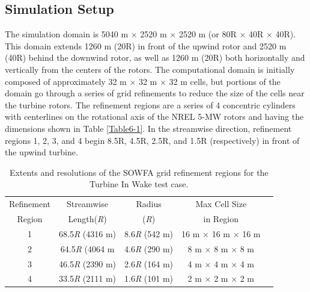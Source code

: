 \subsection{Simulation Setup} \label{section6-7-1}

The simulation domain is 5040 m $\times$ 2520 m $\times$ 2520 m (or 80R $\times$ 40R $\times$ 40R). This domain extends 1260 m (20R) in front of the upwind rotor and 2520 m (40R) behind the downwind rotor, as well as 1260 m (20R) both horizontally and vertically from the centers of the rotors. The computational domain is initially composed of approximately 32 m $\times$ 32 m $\times$ 32 m cells, but portions of the domain go through a series of grid refinements to reduce the size of the cells near the turbine rotors. The refinement regions are a series of 4 concentric cylinders with centerlines on the rotational axis of the NREL 5-MW rotors and having the dimensions shown in Table \ref{Table6-1}. In the streamwise direction, refinement regions 1, 2, 3, and 4 begin 8.5R, 4.5R, 2.5R, and 1.5R (respectively) in front of the upwind turbine.

\begin{table}[ht]
\centering
\begin{tabular}{c c c c c}
\hline
Refinement & Streamwise       & Radius     & Max Cell Size\\
Region     & Length(\emph{R}) & (\emph{R}) &  in Region\\
\hline
1          & 68.5\emph{R} (4316 m)  & 8.6\emph{R} (542 m) & 16 m $\times$ 16 m $\times$ 16 m\\
2          & 64.5\emph{R} (4064 m   & 4.6\emph{R} (290 m) & 8 m $\times$ 8 m $\times$ 8 m\\
3          & 46.5\emph{R} (2390 m)  & 2.6\emph{R} (164 m) & 4 m $\times$ 4 m $\times$ 4 m\\
4          & 33.5\emph{R} (2111 m)  & 1.6\emph{R} (101 m) & 2 m $\times$ 2 m $\times$ 2 m\\
\hline
\end{tabular}
\caption{ Extents and resolutions of the SOWFA grid refinement regions for the Turbine In Wake test case.}
 \label{Table6-5}
\end{table}

